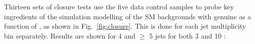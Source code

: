 Thirteen sets of closure tests use the five data control samples to
probe key ingredients of the simulation modelling of the SM
backgrounds with genuine \met as a function of \scalht, as shown in
Fig.~\ref{fig:closure}. This is done for each jet multiplicity bin
separately. Results are shown for 4 and $\geq$ 5 jets for both 3 \ifb and 10 \ifb: 
\begin{figure}[h!]
  \begin{center}
     ~~
     \\
     ~~

\end{center}
\end{figure}
